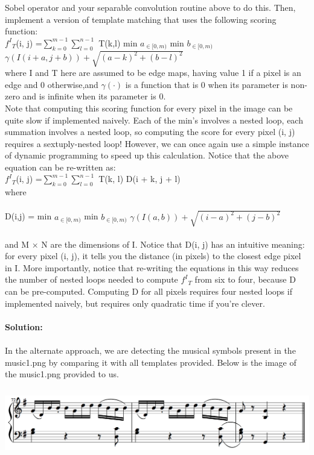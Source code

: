 \documentclass{article}
\begin{document}
\begin{enumerate}
		Sobel operator and your separable convolution routine above to do this. Then, implement a version of
		template matching that uses the following scoring function: \\
		${f^I}_T$(i, j) =$\sum\limits_{k=0}^{m-1} \sum\limits_{l=0}^{n-1}$ T(k,l) min $a_{\in [0,m)}$ min $b_{\in [0,m)}$ $\gamma (I(i + a, j + b)) + \sqrt{(a − k)^2 + (b − l)^2}$ \\
		where I and T here are assumed to be edge maps, having value 1 if a pixel is an edge and 0 otherwise,and $\gamma(\cdot)$ is a function that is 0 when its parameter is non-zero and is infinite when its parameter is 0. \\
		Note that computing this scoring function for every pixel in the image can be quite slow if implemented
		naively. Each of the min’s involves a nested loop, each summation involves a nested loop, so computing
		the score for every pixel (i, j) requires a sextuply-nested loop! However, we can once again use a simple
		instance of dynamic programming to speed up this calculation. Notice that the above equation can be
		re-written as:\\
		${f^I}_T$(i, j) =$\sum\limits_{k=0}^{m-1} \sum\limits_{l=0}^{n-1}$ T(k, l) D(i + k, j + l) \\ where \\ \\ D(i,j) = min $a_{\in [0,m)}$ min $b_{\in [0,m)}$ $\gamma (I(a,b)) + \sqrt{(i - a)^2 + (j - b)^2}$ \\ \\
		and M × N are the dimensions of I. Notice that D(i, j) has an intuitive meaning: for every pixel
		(i, j), it tells you the distance (in pixels) to the closest edge pixel in I. More importantly, notice that
		re-writing the equations in this way reduces the number of nested loops needed to compute ${f^I}_T$
		from six to four, because D can be pre-computed. Computing D for all pixels requires four nested loops if implemented naively, but requires only quadratic time if you’re clever. \\ \\
		\textbf{Solution:} \\ \\
		In the alternate approach, we are detecting the musical symbols present in the music1.png by comparing it with all templates provided. 
		Below is the image of the music1.png provided to us. 
		\begin{center}
			\includegraphics[height=3cm,width=14cm ]{music1.png}	\\	

\end{center}
\end{enumerate}
\end{document}
